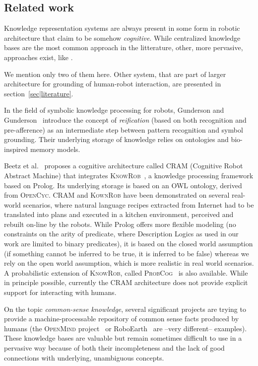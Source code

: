 \documentclass{svmult}
\begin{document}
\subsection{Related work}

Knowledge representation systems are always present in some form in robotic
architecture that claim to be somehow \emph{cognitive}. While centralized
knowledge bases are the most common approach in the litterature, other, more
pervasive, approaches exist, like \cite{Jacobsson2008}.

We mention only two of them here. Other system, that are part of larger
architecture for grounding of human-robot interaction, are presented in
section~\ref{sec|literature}.

In the field of symbolic knowledge processing for robots, Gunderson and
Gunderson~\cite{Gunderson2008} introduce the concept of \emph{reification}
(based on both recognition and pre-afference) as an intermediate step between
pattern recognition and symbol grounding. Their underlying storage of knowledge
relies on ontologies and bio-inspired memory models.

Beetz et al.~\cite{Beetz2010} proposes a cognitive architecture called
\textsc{CRAM} (Cognitive Robot Abstract Machine) that integrates
\textsc{KnowRob}~\cite{Tenorth2009a}, a knowledge processing framework based on
Prolog. Its underlying storage is based on an OWL ontology, derived from
\textsc{OpenCyc}. \textsc{CRAM} and \textsc{KownRob} have been demonstrated on
several real-world scenarios, where natural language recipes extracted from
Internet had to be translated into plans and executed in a kitchen environment,
perceived and rebuilt on-line by the robots. While Prolog offers more flexible
modeling (no constraints on the arity of predicate, where Description Logics as
used in our work are limited to binary predicates), it is based on the closed
world assumption (if something cannot be inferred to be true, it is inferred to
be false) whereas we rely on the open world assumption, which is more realistic
in real world scenarios. A probabilistic extension of \textsc{KnowRob}, called
\textsc{ProbCog}~\cite{Jain2009} is also available. While in principle
possible, currently the CRAM architecture does not provide explicit support for
interacting with humans.

On the topic \emph{common-sense knowledge}, several significant projects are
trying to provide a machine-processable repository of common sense facts
produced by humans (the \textsc{OpenMind} project~\cite{Singh2002} or
RoboEarth~\cite{Waibel2011} are --very different-- examples). These knowledge
bases are valuable but remain sometimes difficult to use in a pervasive way
because of both their incompleteness and the lack of good connections with
underlying, unambiguous concepts.
\end{document}

